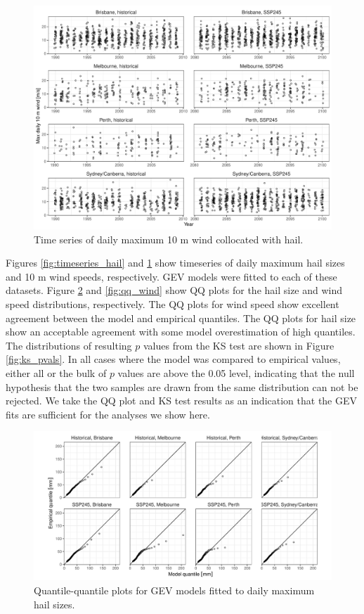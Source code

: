 \documentclass[]{agujournal2019}\usepackage[]{graphicx}\usepackage[]{xcolor}
\begin{document}
\begin{figure}[!ht]
      \includegraphics[width=\textwidth]{figures/timeseries_wind}
      \caption{Time series of daily maximum 10 m wind collocated with hail.}
      \label{fig:timeseries_wind}
\end{figure}

Figures \ref{fig:timeseries_hail} and \ref{fig:timeseries_wind} show timeseries of daily maximum hail sizes and 10 m wind speeds, respectively. GEV models were fitted to each of these datasets. Figure \ref{fig:qq_hail} and \ref{fig:qq_wind} show QQ plots for the hail size and wind speed distributions, respectively. The QQ plots for wind speed show excellent agreement between the model and empirical quantiles. The QQ plots for hail size show an acceptable agreement with some model overestimation of high quantiles. The distributions of resulting $p$ values from the KS test are shown in Figure \ref{fig:ks_pvals}. In all cases where the model was compared to empirical values, either all or the bulk of $p$ values are above the 0.05 level, indicating that the null hypothesis that the two samples are drawn from the same distribution can not be rejected. We take the QQ plot and KS test results as an indication that the GEV fits are sufficient for the analyses we show here. 

\begin{figure}[!ht]
      \includegraphics[width=\textwidth]{figures/qq_hail}
      \caption{Quantile-quantile plots for GEV models fitted to daily maximum hail sizes.}
      \label{fig:qq_hail}
\end{figure}
\end{document}
